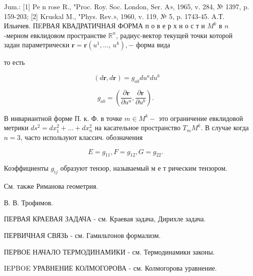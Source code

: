 \documentclass[10pt]{article}
\begin{document}
Jum.: [1] Pe n rose R., "Proc. Roy. Soc. London, Ser. A», 1965, v. 284, № 1397, p. 159-203; [2] Kruskal M., "Phys. Rev.», 1960, v. 119, № 5, p. 1743-45. A.Т. Ильичев. ПEРВАЯ КВАДРАТИЧНАЯ ФОРМА п о в е р х н о с т и $M^{k}$ в $n$-мерном евклидовом пространстве $\mathbb{R}^{n}$, радиус-вектор текущей точки которой задан параметрически $\boldsymbol{r}=\boldsymbol{r}\left(u^{1}, \ldots\right.$, $\left.u^{k}\right),-$ форма вида



то есть



\[

(d \boldsymbol{r}, d \boldsymbol{r})=g_{a b} d u^{a} d u^{b}

\]



\[

g_{a b}=\left(\frac{\partial \boldsymbol{r}}{\partial u^{a}}, \frac{\partial \boldsymbol{r}}{\partial u^{b}}\right) \text {. }

\]



В инвариантной форме П. к. Ф. в точке $m \in M^{k}-$ это ограничение евклидовой метрики $d s^{2}=d x_{1}^{2}+\ldots+d x_{n}^{2}$ на касательное пространство $T_{m} M^{k}$. В случае когда $n=3$, часто используют классич. обозначения



\[

E=g_{11}, F=g_{12}, G=g_{22} \text {. }

\]



Коэффициенты $g_{i j}$ образуют тензор, называемый м е т рическим тензором.



См. также Риманова геометрия.



В. В. Трофимов.



ПЕРВАЯ КРАЕВАЯ ЗАДАЧА - см. Краевая задача, Дирихле задача.



ПЕРВИЧНАЯ СВЯЗЬ - см. Гамильтонов формализм.



ПЕРВОЕ НАЧАЛО ТЕРМОДИНАМИКИ - см. Термодинамики законы.



IEPBOE УРАВНЕНИЕ КОЛМОГОРОВА - см. Колмогорова уравнение.
\end{document}
